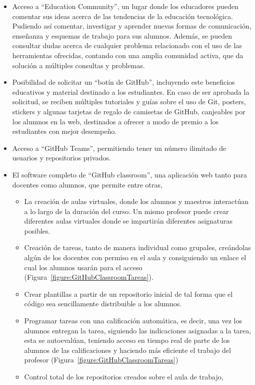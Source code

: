 \begin{itemize}
\item Acceso a ``Education Community'', un lugar donde los educadores
  pueden comentar sus ideas acerca de las tendencias de la educación
  tecnológica. Pudiendo así comentar, investigar y aprender nuevas formas
  de comunicación, enseñanza y esquemas de trabajo para sus alumnos.
  Además, se pueden consultar dudas acerca de cualquier problema
  relacionado con el uso de las herramientas ofrecidas, contando con una
  amplia comunidad activa, que da solución a múltiples consultas y
  problemas.
\item Posibilidad de solicitar un ``botín de GitHub'', incluyendo este
  beneficios educativos y material destinado a los estudiantes. En caso de
  ser aprobada la solicitud, se reciben múltiples tutoriales y guías sobre
  el uso de Git, posters, stickers y algunas tarjetas de regalo de
  camisetas de GitHub, canjeables por los alumnos en la web, destinados a
  ofrecer a modo de premio a los estudiantes con mejor desempeño.
\item Acceso a ``GitHub Teams'', permitiendo tener un número ilimitado de
  usuarios y repositorios privados.
\item El software completo de “GitHub classroom”, una aplicación web tanto
  para docentes como alumnos, que permite entre otras,
  \begin{itemize}
  \item La creación de aulas virtuales, donde los alumnos y maestros
    interactúan a lo largo de la duración del curso. Un mismo profesor
    puede crear diferentes aulas virtuales donde se impartirán diferentes
    asignaturas posibles.
  \item Creación de tareas, tanto de manera
    individual como grupales, creándolas algún de los docentes con permiso
    en el aula y consiguiendo un enlace el cual los alumnos usarán para el
    acceso (Figura~\ref{figure:GitHubClassroomTareas}).
  \item Crear plantillas a partir de un repositorio inicial de tal forma
    que el código sea sencillamente distribuible a los alumnos.
  \item Programar tareas con una calificación automática, es decir, una vez
    los alumnos entregan la tarea, siguiendo las indicaciones asignadas a
    la tarea, esta se autoevalúan, teniendo acceso en tiempo real de parte
    de los alumnos de las calificaciones y haciendo más eficiente el
    trabajo del profesor (Figura~\ref{figure:GitHubClassroomTareas})
  \item Control total de los repositorios creados sobre el aula de trabajo,

\end{itemize}
\end{itemize}
